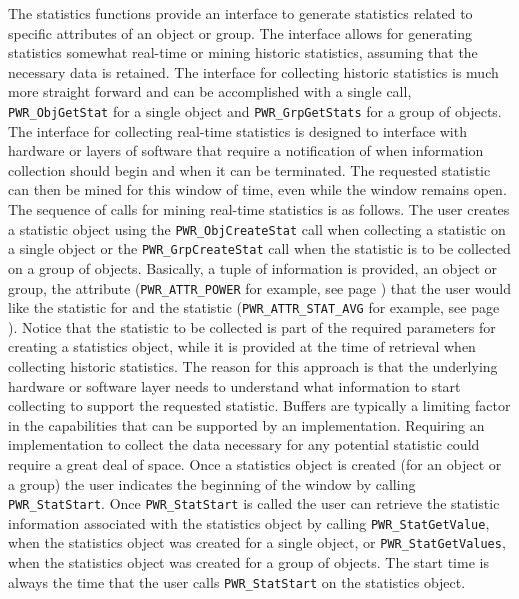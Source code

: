 The statistics functions provide an interface to generate statistics related to specific attributes of an object or group. 
The interface allows for generating statistics somewhat real-time or mining historic statistics, assuming that the necessary data is retained.
The interface for collecting historic statistics is much more straight forward and can be accomplished with a single call, \texttt{PWR_ObjGetStat} for a single object and \texttt{PWR_GrpGetStats} for a group of objects. 
The interface for collecting real-time statistics is designed to interface with hardware or layers of software that require a notification of when information collection should begin and when it can be terminated. 
The requested statistic can then be mined for this window of time, even while the window remains open. 
The sequence of calls for mining real-time statistics is as follows.
The user creates a statistic object using the \texttt{PWR_ObjCreateStat} call when collecting a statistic on a single object or the \texttt{PWR_GrpCreateStat} call when the statistic is to be collected on a group of objects.
Basically, a tuple of information is provided, an object or group, the attribute (\texttt{PWR_ATTR_POWER} for example, see page \pageref{type:AttrName}) that the user would like the statistic for and the statistic (\texttt{PWR_ATTR_STAT_AVG} for example, see page \pageref{type:AttrStat}).
Notice that the statistic to be collected is part of the required parameters for creating a statistics object, while it is provided at the time of retrieval when collecting historic statistics.
The reason for this approach is that the underlying hardware or software layer needs to understand what information to start collecting to support the requested statistic. 
Buffers are typically a limiting factor in the capabilities that can be supported by an implementation. 
Requiring an implementation to collect the data necessary for any potential statistic could require a great deal of space.
Once a statistics object is created (for an object or a group) the user indicates the beginning of the window by calling \texttt{PWR_StatStart}.
Once \texttt{PWR_StatStart} is called the user can retrieve the statistic information associated with the statistics object by calling \texttt{PWR_StatGetValue}, when the statistics object was created for a single object, or \texttt{PWR_StatGetValues}, when the statistics object was created for a group of objects.
The start time is always the time that the user calls \texttt{PWR_StatStart} on the statistics object.
